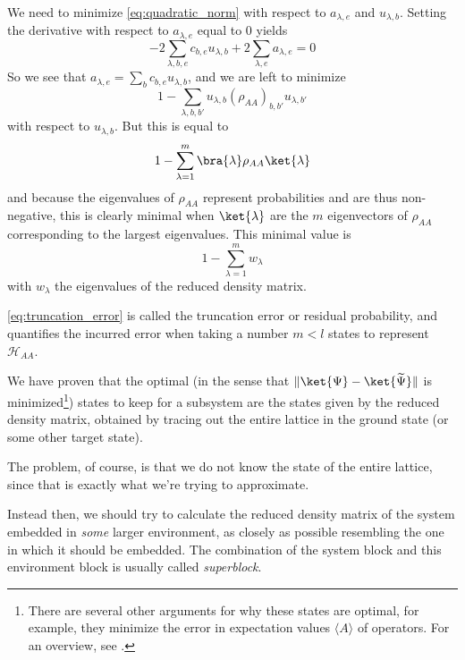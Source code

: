 We need to minimize \eqref{eq:quadratic_norm} with respect to $a_{\lambda, e}$
and $u_{\lambda, b}$. Setting the derivative with respect to $a_{\lambda, e}$ equal to 0 yields
\begin{equation}
  -2 \sum_{\lambda, b, e} c_{b, e} u_{\lambda, b} + 2 \sum_{\lambda, e} a_{\lambda, e} = 0
\end{equation}
So we see that $a_{\lambda, e} = \sum_{b} c_{b, e} u_{\lambda, b}$, and we are left to minimize
\begin{equation}
  1 - \sum_{\lambda, b, b'} u_{\lambda, b} (\rho_{AA})_{b, b'} u_{\lambda, b'}
\end{equation}
with respect to $u_{\lambda, b}$. But this is equal to
\begin{equation}
  1 - \sum_{\lambda = 1}^{m} \bra{\lambda} \rho_{AA} \ket{\lambda}
\end{equation}
and because the eigenvalues of $\rho_{AA}$ represent probabilities and are thus
non-negative, this is clearly minimal when $\ket{\lambda}$ are the $m$
eigenvectors of $\rho_{AA}$ corresponding to the largest eigenvalues. This minimal value is
\begin{equation}\label{eq:truncation_error}
  1 - \sum_{\lambda = 1}^{m} w_{\lambda}
\end{equation}
with $w_{\lambda}$ the eigenvalues of the reduced density matrix.

\eqref{eq:truncation_error} is called the truncation error or residual
probability, and quantifies the incurred error when taking a number $m < l$ states to
represent $\mathcal{H}_{AA}$.


We have proven that the optimal (in the sense that $\Vert \ket{\Psi}
- \ket{\widetilde{\Psi}} \Vert$ is minimized\footnote{There are several other
arguments for why these states are optimal, for example, they minimize the
error in expectation values $\langle A \rangle$ of operators. For an overview,
see \cite{schollwock2005density}.}) states to keep for a subsystem are the
states given by the reduced density matrix, obtained by tracing out the entire
lattice in the ground state (or some other target state).

The problem, of
course, is that we do not know the state of the entire lattice, since that is
exactly what we're trying to approximate.

Instead then, we should try to calculate the reduced density matrix of the
system embedded in \textit{some} larger environment, as closely as possible
resembling the one in which it should be embedded.  The combination of the
system block and this environment block is usually called \textit{superblock}.

